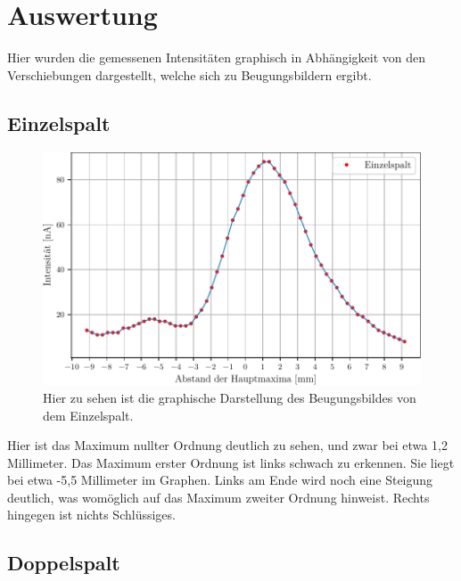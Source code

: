 \section{Auswertung}

Hier wurden die gemessenen Intensitäten graphisch in Abhängigkeit von den Verschiebungen dargestellt, welche sich zu Beugungsbildern ergibt.

\subsection{Einzelspalt}

\begin{figure}
  \centering
  \includegraphics{content/single.pdf}
  \caption{Hier zu sehen ist die graphische Darstellung des Beugungsbildes von dem Einzelspalt.}
  \label{fig:single}
\end{figure}

Hier ist das Maximum nullter Ordnung deutlich zu sehen, und zwar bei etwa 1,2 Millimeter. Das Maximum erster Ordnung ist links schwach zu erkennen. Sie liegt bei etwa -5,5 Millimeter im Graphen. Links am Ende wird noch eine Steigung deutlich, was womöglich auf das Maximum zweiter Ordnung hinweist. Rechts hingegen ist nichts Schlüssiges.

\subsection{Doppelspalt}

